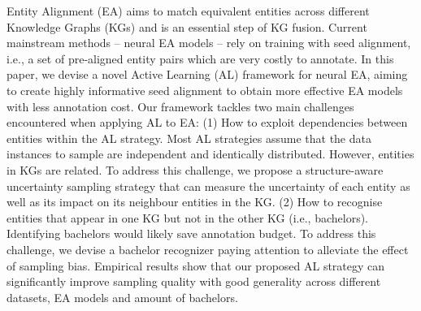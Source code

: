 Entity Alignment (EA) aims to match equivalent entities across different Knowledge Graphs (KGs) and is an essential step of KG fusion. Current mainstream methods -- neural EA models -- rely on training with seed alignment, i.e., a set of pre-aligned entity pairs which are very costly to annotate. In this paper, we devise a novel Active Learning (AL) framework for neural EA, aiming to create highly informative seed alignment to obtain more effective EA models with less annotation cost. Our framework tackles two main challenges encountered when applying AL to EA: (1) How to exploit dependencies between entities within the AL strategy. Most AL strategies assume that the data instances to sample are independent and identically distributed. However, entities in KGs are related. To address this challenge, we propose a structure-aware uncertainty sampling strategy that can measure the uncertainty of each entity as well as its impact on its neighbour entities in the KG. (2) How to recognise entities that appear in one KG but not in the other KG (i.e., bachelors). Identifying bachelors would likely save annotation budget. To address this challenge, we devise a bachelor recognizer paying attention to alleviate the effect of sampling bias. Empirical results show that our proposed AL strategy can significantly improve sampling quality with good generality across different datasets, EA models and amount of bachelors.

